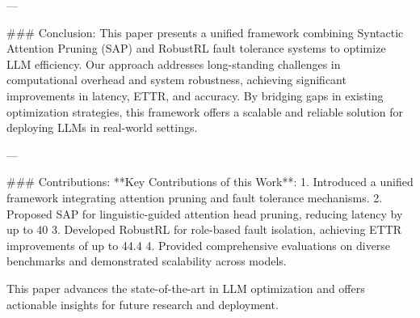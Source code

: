 ---

### Conclusion:
This paper presents a unified framework combining Syntactic Attention Pruning (SAP) and RobustRL fault tolerance systems to optimize LLM efficiency. Our approach addresses long-standing challenges in computational overhead and system robustness, achieving significant improvements in latency, ETTR, and accuracy. By bridging gaps in existing optimization strategies, this framework offers a scalable and reliable solution for deploying LLMs in real-world settings.

---

### Contributions:
**Key Contributions of this Work**:
1. Introduced a unified framework integrating attention pruning and fault tolerance mechanisms.
2. Proposed SAP for linguistic-guided attention head pruning, reducing latency by up to 40%
3. Developed RobustRL for role-based fault isolation, achieving ETTR improvements of up to 44.4%
4. Provided comprehensive evaluations on diverse benchmarks and demonstrated scalability across models.

This paper advances the state-of-the-art in LLM optimization and offers actionable insights for future research and deployment.